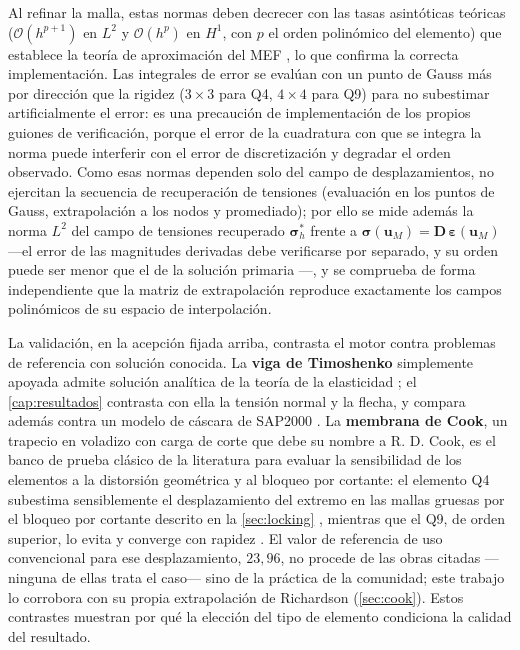 Al refinar la malla, estas normas deben decrecer con las tasas asintóticas teóricas ($\mathcal{O}(h^{p+1})$ en $L^2$ y $\mathcal{O}(h^p)$ en $H^1$, con $p$ el orden polinómico del elemento) que establece la teoría de aproximación del MEF \autocites[pp.~106-107]{strang2008analysis}[pp.~189-190]{hughes2000fem}, lo que confirma la correcta implementación. Las integrales de error se evalúan con un punto de Gauss más por dirección que la rigidez ($3\times3$ para Q4, $4\times4$ para Q9) para no subestimar artificialmente el error: es una precaución de implementación de los propios guiones de verificación, porque el error de la cuadratura con que se integra la norma puede interferir con el error de discretización y degradar el orden observado. Como esas normas dependen solo del campo de desplazamientos, no ejercitan la secuencia de recuperación de tensiones (evaluación en los puntos de Gauss, extrapolación a los nodos y promediado); por ello se mide además la norma $L^2$ del campo de tensiones recuperado $\bm{\sigma}^*_h$ frente a $\bm{\sigma}(\bm{u}_M)=\bm{D}\,\bm{\varepsilon}(\bm{u}_M)$ —el error de las magnitudes derivadas debe verificarse por separado, y su orden puede ser menor que el de la solución primaria \autocite[p.~29]{salari2000mms}—, y se comprueba de forma independiente que la matriz de extrapolación reproduce exactamente los campos polinómicos de su espacio de interpolación.

La validación, en la acepción fijada arriba, contrasta el motor contra problemas de referencia con solución conocida. La \textbf{viga de Timoshenko} simplemente apoyada admite solución analítica de la teoría de la elasticidad \autocite[art.~21, pp.~39-43]{timoshenko1970elasticity}; el \autoref{cap:resultados} contrasta con ella la tensión normal y la flecha, y compara además contra un modelo de cáscara de SAP2000 \autocite[p.~179]{csi2017sap2000}. La \textbf{membrana de Cook}, un trapecio en voladizo con carga de corte que debe su nombre a R. D. Cook, es el banco de prueba clásico de la literatura para evaluar la sensibilidad de los elementos a la distorsión geométrica y al bloqueo por cortante: el elemento Q4 subestima sensiblemente el desplazamiento del extremo en las mallas gruesas por el bloqueo por cortante descrito en la \autoref{sec:locking} \autocite[pp.~98-99]{cook2002concepts}, mientras que el Q9, de orden superior, lo evita y converge con rapidez \autocite[p.~243]{hughes2000fem}. El valor de referencia de uso convencional para ese desplazamiento, $23{,}96$, no procede de las obras citadas —ninguna de ellas trata el caso— sino de la práctica de la comunidad; este trabajo lo corrobora con su propia extrapolación de Richardson (\autoref{sec:cook}). Estos contrastes muestran por qué la elección del tipo de elemento condiciona la calidad del resultado.
